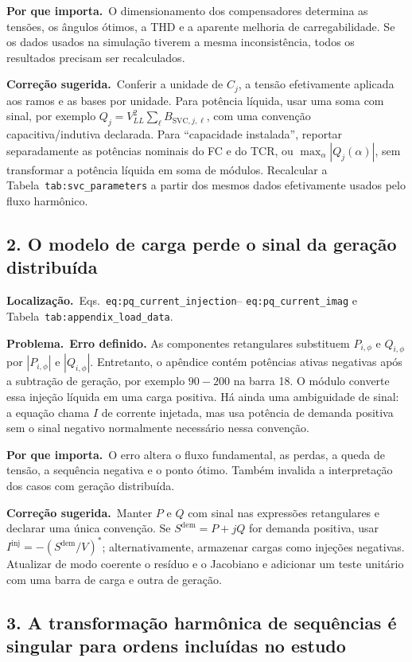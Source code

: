 \documentclass[11pt,a4paper]{article}
\newcommand{\localizacao}{\textbf{Localização.}\ }
\newcommand{\problema}{\textbf{Problema.}\ }
\newcommand{\impacto}{\textbf{Por que importa.}\ }
\newcommand{\correcao}{\textbf{Correção sugerida.}\ }
\begin{document}
\impacto O dimensionamento dos compensadores determina as tensões, os ângulos
ótimos, a THD e a aparente melhoria de carregabilidade. Se os dados usados na
simulação tiverem a mesma inconsistência, todos os resultados precisam ser
recalculados.

\correcao Conferir a unidade de $C_j$, a tensão efetivamente aplicada aos
ramos e as bases por unidade. Para potência líquida, usar uma soma com sinal,
por exemplo $Q_j=V_{LL}^2\sum_\ell
B_{\mathrm{SVC},j,\ell}$, com uma convenção capacitiva/indutiva declarada.
Para ``capacidade instalada'', reportar separadamente as potências nominais do
FC e do TCR, ou $\max_\alpha |Q_j(\alpha)|$, sem transformar a potência líquida
em soma de módulos. Recalcular a Tabela~\texttt{tab:svc\_parameters} a partir
dos mesmos dados efetivamente usados pelo fluxo harmônico.

\subsection*{2. O modelo de carga perde o sinal da geração distribuída}

\localizacao Eqs.~\texttt{eq:pq\_current\_injection}--
\texttt{eq:pq\_current\_imag} e Tabela~\texttt{tab:appendix\_load\_data}.

\problema \textbf{Erro definido.} As componentes retangulares substituem
$P_{i,\phi}$ e $Q_{i,\phi}$ por $|P_{i,\phi}|$ e $|Q_{i,\phi}|$. Entretanto,
o apêndice contém potências ativas negativas após a subtração de geração, por
exemplo $90-200$ na barra 18. O módulo converte essa injeção líquida em uma
carga positiva. Há ainda uma ambiguidade de sinal: a equação chama $I$ de
corrente injetada, mas usa potência de demanda positiva sem o sinal negativo
normalmente necessário nessa convenção.

\impacto O erro altera o fluxo fundamental, as perdas, a queda de tensão, a
sequência negativa e o ponto ótimo. Também invalida a interpretação dos casos
com geração distribuída.

\correcao Manter $P$ e $Q$ com sinal nas expressões retangulares e declarar
uma única convenção. Se $S^{\mathrm{dem}}=P+jQ$ for demanda positiva, usar
$I^{\mathrm{inj}}=-(S^{\mathrm{dem}}/V)^*$; alternativamente, armazenar cargas
como injeções negativas. Atualizar de modo coerente o resíduo e o Jacobiano e
adicionar um teste unitário com uma barra de carga e outra de geração.

\subsection*{3. A transformação harmônica de sequências é singular para ordens incluídas no estudo}
\end{document}
